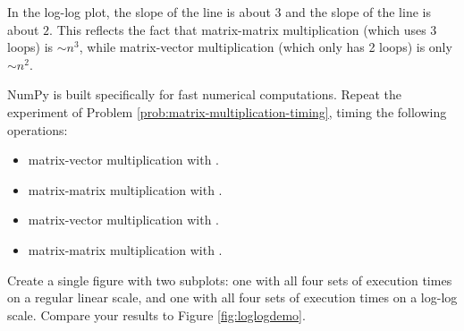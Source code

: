 In the log-log plot, the slope of the  line is about $3$ and the slope of the  line is about $2$.
This reflects the fact that matrix-matrix multiplication (which uses 3 loops) is $\sim n^3$, while matrix-vector multiplication (which only has 2 loops) is only $\sim n^2$.

\begin{problem} %
NumPy is built specifically for fast numerical computations.
Repeat the experiment of Problem \ref{prob:matrix-multiplication-timing}, timing the following operations:
%
\begin{itemize}
\item matrix-vector multiplication with .
\item matrix-matrix multiplication with .
\item matrix-vector multiplication with .
\item matrix-matrix multiplication with .
\end{itemize}

Create a single figure with two subplots: one with all four sets of execution times on a regular linear scale, and one with all four sets of execution times on a log-log scale.
Compare your results to Figure \ref{fig:loglogdemo}.
\label{prob:numpy-is-awesome}
\end{problem}



